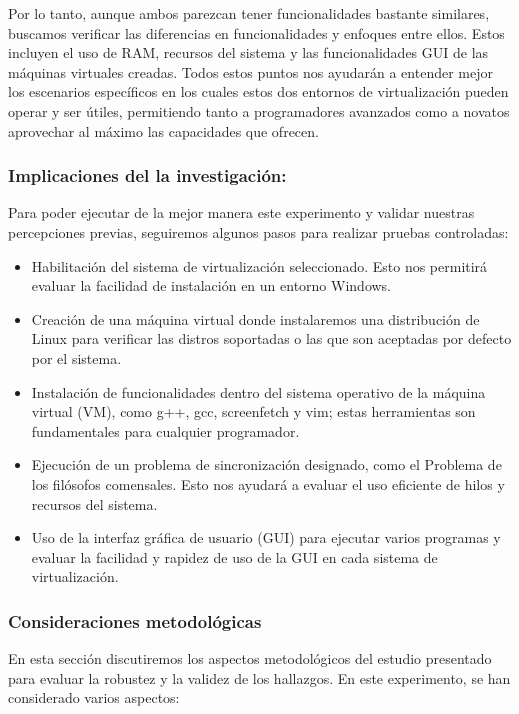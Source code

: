 \documentclass[journal]{IEEEtran}
\begin{document}
Por lo tanto, aunque ambos parezcan tener funcionalidades bastante similares, buscamos verificar las diferencias en funcionalidades y enfoques entre ellos. Estos incluyen el uso de RAM, recursos del sistema y las funcionalidades GUI de las máquinas virtuales creadas. Todos estos puntos nos ayudarán a entender mejor los escenarios específicos en los cuales estos dos entornos de virtualización pueden operar y ser útiles, permitiendo tanto a programadores avanzados como a novatos aprovechar al máximo las capacidades que ofrecen.\\

\subsubsection{Implicaciones del la investigación:}
Para poder ejecutar de la mejor manera este experimento y validar nuestras percepciones previas, seguiremos algunos pasos para realizar pruebas controladas:

\begin{itemize}
    \item Habilitación del sistema de virtualización seleccionado. Esto nos permitirá evaluar la facilidad de instalación en un entorno Windows.
    
    \item Creación de una máquina virtual donde instalaremos una distribución de Linux para verificar las distros soportadas o las que son aceptadas por defecto por el sistema.
    
    \item Instalación de funcionalidades dentro del sistema operativo de la máquina virtual (VM), como g++, gcc, screenfetch y vim; estas herramientas son fundamentales para cualquier programador.
    
    \item Ejecución de un problema de sincronización designado, como el Problema de los filósofos comensales. Esto nos ayudará a evaluar el uso eficiente de hilos y recursos del sistema.
    
    \item Uso de la interfaz gráfica de usuario (GUI) para ejecutar varios programas y evaluar la facilidad y rapidez de uso de la GUI en cada sistema de virtualización.
\end{itemize}

\subsubsection{Consideraciones metodológicas}
En esta sección discutiremos los aspectos metodológicos del estudio presentado para evaluar la robustez y la validez de los hallazgos. En este experimento, se han considerado varios aspectos:
\end{document}
